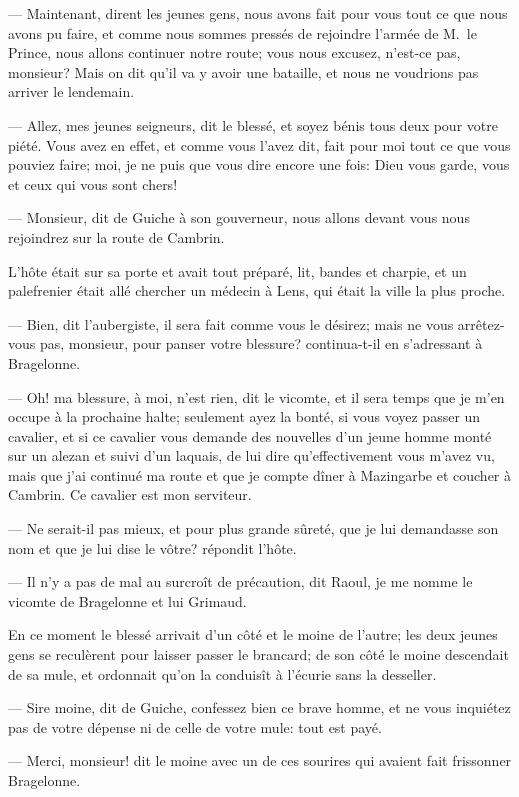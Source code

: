 — Maintenant, dirent les jeunes gens, nous avons fait pour vous tout ce que nous avons pu faire, et comme nous sommes pressés de rejoindre l'armée de M.~le Prince, nous allons continuer notre route; vous nous excusez, n'est-ce pas, monsieur? Mais on dit qu'il va y avoir une bataille, et nous ne voudrions pas arriver le lendemain.

— Allez, mes jeunes seigneurs, dit le blessé, et soyez bénis tous deux pour votre piété. Vous avez en effet, et comme vous l'avez dit, fait pour moi tout ce que vous pouviez faire; moi, je ne puis que vous dire encore une fois: Dieu vous garde, vous et ceux qui vous sont chers!

— Monsieur, dit de Guiche à son gouverneur, nous allons devant vous nous rejoindrez sur la route de Cambrin.

L'hôte était sur sa porte et avait tout préparé, lit, bandes et charpie, et un palefrenier était allé chercher un médecin à Lens, qui était la ville la plus proche.

— Bien, dit l'aubergiste, il sera fait comme vous le désirez; mais ne vous arrêtez-vous pas, monsieur, pour panser votre blessure? continua-t-il en s'adressant à Bragelonne.

— Oh! ma blessure, à moi, n'est rien, dit le vicomte, et il sera temps que je m'en occupe à la prochaine halte; seulement ayez la bonté, si vous voyez passer un cavalier, et si ce cavalier vous demande des nouvelles d'un jeune homme monté sur un alezan et suivi d'un laquais, de lui dire qu'effectivement vous m'avez vu, mais que j'ai continué ma route et que je compte dîner à Mazingarbe et coucher à Cambrin. Ce cavalier est mon serviteur.

— Ne serait-il pas mieux, et pour plus grande sûreté, que je lui demandasse son nom et que je lui dise le vôtre? répondit l'hôte.

— Il n'y a pas de mal au surcroît de précaution, dit Raoul, je me nomme le vicomte de Bragelonne et lui Grimaud.

En ce moment le blessé arrivait d'un côté et le moine de l'autre; les deux jeunes gens se reculèrent pour laisser passer le brancard; de son côté le moine descendait de sa mule, et ordonnait qu'on la conduisît à l'écurie sans la desseller.

— Sire moine, dit de Guiche, confessez bien ce brave homme, et ne vous inquiétez pas de votre dépense ni de celle de votre mule: tout est payé.

— Merci, monsieur! dit le moine avec un de ces sourires qui avaient fait frissonner Bragelonne.

